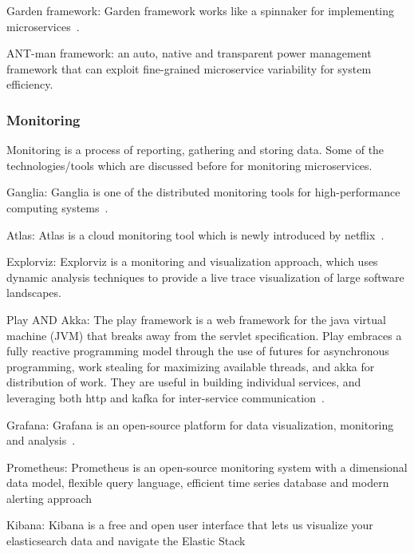 \par Garden framework: Garden framework works like a spinnaker for implementing microservices~\cite{Ellen2018}.

\par ANT-man framework: an auto, native and transparent power management framework that can exploit fine-grained microservice variability for system efficiency\cite{Hou2020}.


\subsubsection{Monitoring}
Monitoring is a process of reporting, gathering and storing data. Some of the technologies/tools which are discussed before for monitoring microservices. 
\par Ganglia: Ganglia is one of the distributed monitoring tools for high-performance computing systems~\cite{Kristiani2020}.

\par Atlas: Atlas is a cloud monitoring tool which is newly introduced by netflix~\cite{Netflix}.

\par Explorviz: Explorviz is a monitoring and visualization approach, which uses dynamic analysis techniques to provide a live trace visualization of large software landscapes\cite{Lenga2019}.

\par Play AND Akka: The play framework is a web framework for the java virtual machine (JVM) that breaks away from the servlet specification. Play embraces a fully reactive programming model through the use of futures for asynchronous programming, work stealing for maximizing available threads, and akka for distribution of work. They are useful in building individual services, and leveraging both http and kafka for inter-service communication~\cite{khan2017}.

\par Grafana: Grafana is an open-source platform for data visualization, monitoring and analysis~\cite{KalskeM2017,Kalske2017}. 

\par Prometheus: Prometheus is an open-source monitoring system with a dimensional data model, flexible query language, efficient time series database and modern alerting approach~\cite{KalskeM2017, Kalske2017} 

\par Kibana: Kibana is a free and open user interface that lets us visualize your elasticsearch data and navigate the Elastic Stack~\cite{KalskeM2017, Kalske2017} 



